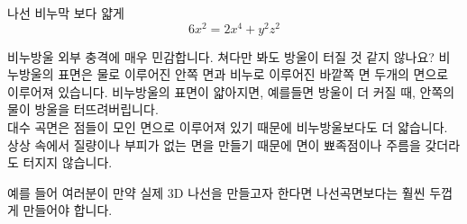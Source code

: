 \begin{surferPage}{나선}
비누막 보다 얇게\\
  \smallskip
\[6x^2	= 2x^4	+ y^2	z^2\]

\singlespacing
비누방울 외부 충격에 매우 민감합니다. 쳐다만 봐도 방울이 터질 것 같지 않나요? 비누방울의 표면은 물로 이루어진 안쪽 면과 비누로 이루어진 바깥쪽 면 두개의 면으로 이루어져 있습니다. 비누방울의 표면이 얇아지면, 예를들면  방울이 더 커질 때, 안쪽의 물이 방울을 터뜨려버립니다.\\
\vspace{0,3cm}
대수 곡면은 점들이 모인 면으로 이루어져 있기 때문에 비누방울보다도 더 얇습니다. 상상  속에서 질량이나 부피가 없는 면을 만들기 때문에 면이 뾰족점이나 주름을 갖더라도 터지지 않습니다.\\
\vspace{0,3cm}

예를 들어 여러분이 만약 실제 3D 나선을 만들고자 한다면 나선곡면보다는 훨씬 두껍게 만들어야 합니다.
\end{surferPage}
